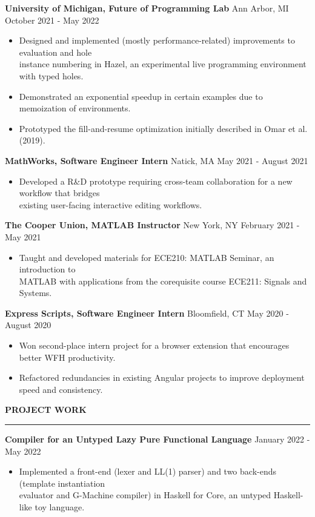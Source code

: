 \documentclass[]{article}
\newcommand{\br}{\vspace{10pt}}
\newcommand{\brs}{\vspace{3pt}}
\newcommand{\hr}{\vspace{4pt}\hrule\vspace{4pt}}
\begin{document}
\brs

\textbf{University of Michigan, Future of Programming Lab}
Ann Arbor, MI
\hfill
October 2021 - May 2022
\begin{itemize}
\item Designed and implemented (mostly performance-related) improvements to evaluation and hole \\
  instance numbering in Hazel, an experimental live programming environment with typed holes.
\item Demonstrated an exponential speedup in certain examples due to memoization of environments.
\item Prototyped the fill-and-resume optimization initially described in Omar et al. (2019).
\end{itemize}

\brs

\textbf{MathWorks, Software Engineer Intern}
Natick, MA
\hfill
May 2021 - August 2021
\begin{itemize}
\item Developed a R\&D prototype requiring cross-team collaboration for a new workflow that bridges\\
  existing user-facing interactive editing workflows.
\end{itemize}

\brs

\textbf{The Cooper Union, MATLAB Instructor}
New York, NY
\hfill
February 2021 - May 2021
\begin{itemize}
\item Taught and developed materials for ECE210: MATLAB Seminar, an introduction to\\
  MATLAB with applications from the corequisite course ECE211: Signals and Systems.
\end{itemize}

\brs

\textbf{Express Scripts, Software Engineer Intern}
Bloomfield, CT
\hfill
May 2020 - August 2020
\begin{itemize}
\item Won second-place intern project for a browser extension that encourages better WFH productivity.
\item Refactored redundancies in existing Angular projects to improve deployment speed and consistency.
\end{itemize}

\br

\textbf{PROJECT WORK}
\hr

\textbf{Compiler for an Untyped Lazy Pure Functional Language}
\hfill
January 2022 - May 2022
\begin{itemize}
\item Implemented a front-end (lexer and LL(1) parser) and two back-ends (template instantiation \\ evaluator and G-Machine compiler) in Haskell for Core, an untyped Haskell-like toy language.
\end{itemize}
\end{document}
